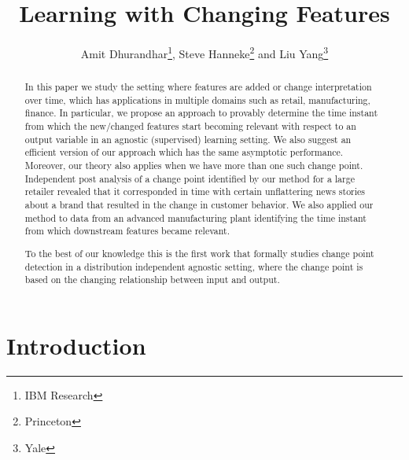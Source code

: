 \documentclass{article}
\title{Learning with Changing Features}
\author{Amit Dhurandhar\footnote{IBM Research}, Steve Hanneke\footnote{Princeton} and Liu Yang\footnote{Yale}}
\begin{document}
\maketitle

\begin{abstract}
  In this paper we study the setting where features are added or
  change interpretation over time, which has applications in multiple
  domains such as retail, manufacturing, finance. In particular, we propose an approach to provably determine the
  time instant from which the new/changed features start becoming
  relevant with respect to an output variable in an agnostic (supervised) learning setting. We also
  suggest an efficient version of our approach which has the same
  asymptotic performance. Moreover, our theory also applies when we
  have more than one such change point. Independent post analysis of a change point identified by our method for a large retailer revealed that it corresponded in time with certain unflattering news stories about a brand that resulted in the change in customer behavior. We also applied our method to data from an advanced manufacturing plant identifying the time instant from which downstream features became relevant.

To the best of our knowledge this is the first work that formally studies change point detection in a distribution independent agnostic setting, where the change point is based on the changing relationship between input and output.

\end{abstract}

\section{Introduction}
\end{document}
